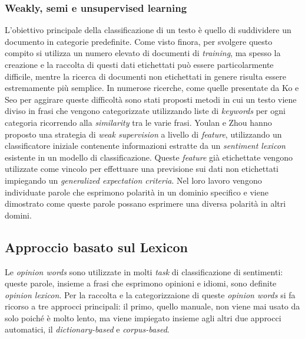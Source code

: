 \documentclass[a4paper,12pt,openright,twoside]{report}
\theoremstyle{definition}
\begin{document}
\subsubsection{Weakly, semi e unsupervised learning}
L'obiettivo principale della classificazione di un testo è quello di suddividere un documento in categorie
predefinite. Come visto finora, per svolgere questo compito si utilizza un numero elevato di documenti di \emph{training},
 ma spesso la creazione e la raccolta di questi dati etichettati può essere particolarmente difficile,
 mentre
la ricerca di documenti non etichettati in genere risulta essere estremamente più semplice.
In numerose ricerche, come quelle presentate da Ko e Seo %
per aggirare queste difficoltà sono stati proposti metodi in cui un testo viene diviso in frasi che vengono categorizzate utilizzando liste
di \emph{keywords} per ogni categoria ricorrendo alla \emph{similarity} tra le varie frasi.
Youlan e Zhou %
hanno proposto una strategia di \emph{weak supervision} a  livello di \emph{feature},
utilizzando un classificatore iniziale contenente informazioni estratte da un \emph{sentiment lexicon} esistente
in un modello di classificazione. Queste \emph{feature} già etichettate vengono utilizzate come vincolo per effettuare
una previsione sui dati non etichettati impiegando un \emph{generalized expectation criteria}.
Nel loro lavoro vengono individuate parole che esprimono polarità in un dominio specifico e viene dimostrato
come queste parole possano esprimere una diversa polarità in altri domini.
\subsection{Approccio basato sul Lexicon}
Le \emph{opinion words} sono utilizzate in molti \emph{task} di classificazione di sentimenti: queste parole,
insieme a frasi che esprimono opinioni e idiomi, sono definite \emph{opinion lexicon}. 
Per la raccolta e la categorizzaione di queste \emph{opinion words} si 
fa ricorso a tre approcci principali: il primo,
quello manuale, non viene mai usato da solo poiché è molto lento, ma viene impiegato insieme agli
altri due approcci automatici, il \emph{dictionary-based} e \emph{corpus-based}.
\end{document}
